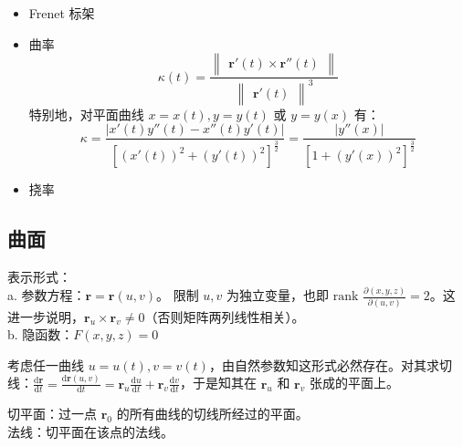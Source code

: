 \documentclass[12pt, a4paper, UTF8, openany]{ctexbook}
\newcommand{\dif}{\mathrm{d}}
\newcommand{\difx}{\,\mathrm{d}x}
\newcommand{\mat}[1]{\mathbf{#1}}
\newcommand{\len}[1]{\begin{Vmatrix}#1\end{Vmatrix}}%
\begin{document}
\begin{itemize}
            {\heiti 特别地}，对平面曲线 $\dif z \equiv 0$：\\
            a. $y = y(x)$：$\dif s = \sqrt{1 + [y'(x)]^2} \difx$ \\
            b. 极坐标 $\rho = \rho(\theta)$：$\dif s = \sqrt{[\rho(\theta)]^2 + [\rho'(\theta)]^2} \,\dif\theta$

            $s$ 必然单调递增，故存在双射 $s \leftrightarrow t$，进而存在 $\mat{r} = \mat{r}[t(s)]$。称 $s$ 为曲线的自然参数。

            考虑到 $(\dif s)^2 = (\dif x)^2 + (\dif y)^2 + (\dif z^2) \implies 1 = (\frac{\dif x}{\dif s})^2 + (\frac{\dif y}{\dif s})^2 + (\frac{\dif z}{\dif s})^2$，故以此为参数的切向量为{\heiti 单位向量}：
            $$\mat{n} = \frac{\dif \mat{r}}{\dif s} = (\frac{\dif x}{\dif s}, \frac{\dif y}{\dif s}, \frac{\dif z}{\dif s})$$

            \item Frenet 标架
            \item 曲率
                $$\kappa(t) = \frac{\len{\mat{r}'(t) \times \mat{r}''(t)}}{\len{\mat{r}'(t)}^3}$$
                特别地，对平面曲线 $x = x(t), y = y(t)$ 或 $y = y(x)$ 有：
                $$\kappa = \frac{|x'(t)y''(t) - x''(t)y'(t)|}{[(x'(t))^2 + (y'(t))^2]^{\frac{3}{2}}} = \frac{|y''(x)|}{[1 + (y'(x))^2]^{\frac{3}{2}}}$$
            \item 挠率
        \end{itemize}

        \subsection{曲面}
        表示形式：\\
        a. 参数方程：$\mat{r} = \mat{r}(u, v)$。
        限制 $u, v$ 为独立变量，也即 $\text{rank } \frac{\partial (x, y, z)}{\partial (u, v)} = 2$。这进一步说明，$\mat{r}_u \times \mat{r}_v \neq 0$（否则矩阵两列线性相关）。\\
        b. 隐函数：$F(x, y, z) = 0$

        考虑任一曲线 $u = u(t), v = v(t)$，由自然参数知这形式必然存在。对其求切线：$\frac{\dif \mat{r}}{\dif t} = \frac{\dif \mat{r}(u, v)}{\dif t} = \mat{r}_u \frac{\dif u}{\dif t} + \mat{r}_v\frac{\dif v}{\dif t}$，于是知其在 $\mat{r}_u$ 和 $\mat{r}_v$ 张成的平面上。

        切平面：过一点 $\mat{r}_0$ 的所有曲线的切线所经过的平面。\\
        法线：切平面在该点的法线。
\end{document}
